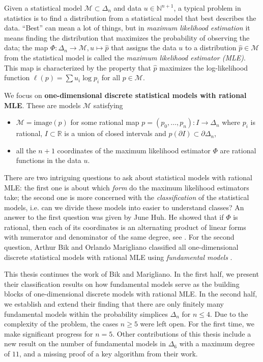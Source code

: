 Given a statistical model \( \mathcal{M} \subset \Delta_n \) and data \( u \in \mathbb{N}^{n+1} \), a typical problem in statistics is to find a distribution from a statistical model that best describes the data. ``Best'' can mean a lot of things, but in \emph{maximum likelihood estimation} it means finding the distribution that maximizes the probability of observing the data; the map \( \Phi: \Delta_n \to \mathcal{M}, u \mapsto \hat p \) that assigns the data \( u \) to a distribution \( \hat p \in \mathcal{M}\) from the statistical model is called the \emph{maximum likelihood estimator (MLE)}. This map is characterized by the property that \( \hat p \) maximizes the log-likelihood function \( \ell(p) = \sum u_i \log p_i \) for all \( p \in \mathcal{M} \). 

We focus on \textbf{{one-dimensional {discrete} {statistical} {models} with rational MLE}}. These are models \( \mathcal{M} \) satisfying 
\begin{itemize}
    \item \( \mathcal{M} = \mathrm{image}(p) \) for some rational map \( p = (p_0, \dots, p_n): I \to \Delta_n \) where \( p_i \) is rational, \( I \subset \mathbb{R} \) is a union of closed intervals and  \( p(\partial I) \subset \partial \Delta_n \),
    \item all the \( n+1 \) coordinates of the maximum likelihood estimator \( \Phi \) are rational functions in the data \( u \).
\end{itemize}
There are two intriguing questions to ask about statistical models with rational MLE: the first one is about which \emph{form} do the maximum likelihood estimators take; the second one is more concerned with the \emph{classification} of the statistical models, i.e. can we divide these models into easier to understand classes? An answer to the first question was given by June Huh. He showed that if \( \Phi \) is rational, then each of its coordinates is an alternating product of linear forms with numerator and denominator of the same degree, see \cite{huh2013varieties, duarte2021discrete}. For the second question, Arthur Bik and Orlando Marigliano classified all one-dimensional discrete statistical models with rational MLE using \emph{fundamental models} \cite{bik2022classifying}.

This thesis continues the work of Bik and Marigliano. In the first half, we present their classification results on how fundamental models serve as the building blocks of one-dimensional discrete models with rational MLE. In the second half, we establish and extend their finding that there are only finitely many fundamental models within the probability simplices \( \Delta_n  \) for \( n \leq 4 \). Due to the complexity of the problem, the cases \( n \geq 5 \) were left open. For the first time, we make significant progress for \( n = 5 \). Other contributions of this thesis include a new result on the number of fundamental models in \( \Delta_6 \) with a maximum degree of \( 11 \), and a missing proof of a key algorithm from their work.